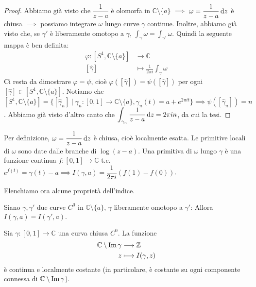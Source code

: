 \begin{proof}
  Abbiamo già visto che $\dfrac{1}{z-a}$ è olomorfa in $\mathbb{C}\setminus\{a\}$ $\implies$ $\omega=\dfrac{1}{z-a}\mathop{}\!\mathrm{d} z$ è chiusa $\implies$ possiamo integrare $\omega$ lungo curve $\gamma$ continue. Inoltre, abbiamo già visto che, se $\gamma'$ è liberamente omotopo a $\gamma$, $\displaystyle \int_{\gamma}\omega=\int_{\gamma'}\omega$. Quindi la seguente mappa è ben definita:
  \begin{align*}
    \varphi:[S^1, \mathbb{C}\setminus\{a\}] &\longrightarrow \mathbb{C}\\
    [\hat{\gamma}] &\longmapsto \frac{1}{2\pi i}\int_{\gamma}\omega
  \end{align*}
  Ci resta da dimostrare $\varphi=\psi$, cioè $\varphi([\hat{\gamma}])=\psi([\hat{\gamma}])$ per ogni $[\hat{\gamma}] \in [S^1, \mathbb{C}\setminus\{a\}]$.
  Notiamo che $[S^1, \mathbb{C}\setminus\{a\}]=\{[\hat{\gamma}_n] \mid \gamma_n:[0,1]\longrightarrow \mathbb{C}\setminus\{a\}, \gamma_n(t)=a+e^{2\pi i t}\} \implies \psi([\hat{\gamma}_n])=n$.
  Abbiamo già visto d'altro canto che $\displaystyle \int_{\gamma_n} \frac{1}{z-a}\mathop{}\!\mathrm{d} z=2\pi i n$, da cui la tesi.
\end{proof}

\begin{oss}
  Per definizione, $\omega=\dfrac{1}{z-a}\mathop{}\!\mathrm{d} z$ è chiusa, cioè localmente esatta. Le primitive locali di $\omega$ sono date dalle branche di $\log(z-a)$. Una primitiva di $\omega$ lungo $\gamma$ è una funzione continua $f:[0,1]\longrightarrow \mathbb{C}$ t.c. $e^{f(t)}=\gamma(t)-a \implies I(\gamma, a)=\dfrac{1}{2\pi i}(f(1)-f(0))$.
\end{oss}

Elenchiamo ora alcune proprietà dell'indice.

\begin{oss}
  Siano $\gamma, \gamma'$ due curve $C^0$ in $\mathbb{C}\setminus\{a\}$, $\gamma$ liberamente omotopo a $\gamma'$: Allora $I(\gamma, a)=I(\gamma',a)$.
\end{oss}

\begin{prop}
  Sia $\gamma:[0,1]\longrightarrow \mathbb{C}$ una curva chiusa $C^0$. La funzione
  \begin{align*}
    \mathbb{C}\setminus\operatorname{Im}{\gamma} &\longrightarrow \mathbb{Z}\\
    z &\longmapsto I(\gamma,z)
  \end{align*}
  è continua e localmente costante (in particolare, è costante su ogni componente connessa di $\mathbb{C}\setminus\operatorname{Im}{\gamma}$).
\end{prop}

